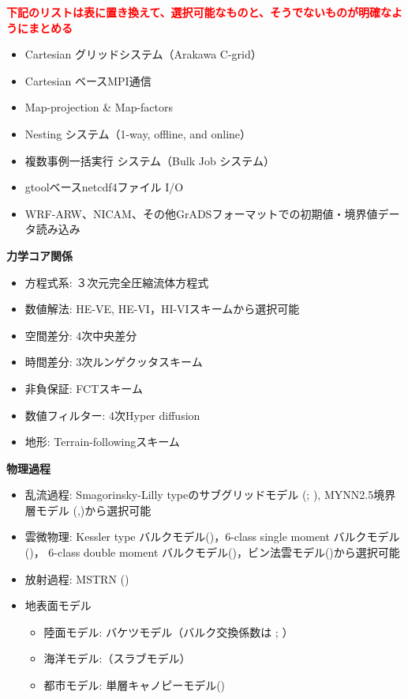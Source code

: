 \textcolor{red}{\bf 下記のリストは表に置き換えて、選択可能なものと、そうでないものが明確なようにまとめる}



\begin{itemize}
 \item Cartesian グリッドシステム（Arakawa C-grid）
 \item Cartesian ベースMPI通信
 \item Map-projection \& Map-factors
 \item Nesting システム（1-way, offline, and online）
 \item 複数事例一括実行 システム（Bulk Job システム）
 \item gtoolベースnetcdf4ファイル I/O
 \item WRF-ARW、NICAM、その他GrADSフォーマットでの初期値・境界値データ読み込み
\end{itemize}

{\bf 力学コア関係}

\begin{itemize}
 \item 方程式系: ３次元完全圧縮流体方程式
 \item 数値解法: HE-VE,  HE-VI，HI-VIスキームから選択可能
 \item 空間差分: 4次中央差分
 \item 時間差分: 3次ルンゲクッタスキーム
 \item 非負保証: FCTスキーム
 \item 数値フィルター: 4次Hyper diffusion
 \item 地形: Terrain-followingスキーム
\end{itemize}

{\bf 物理過程}

\begin{itemize}
 \item 乱流過程: Smagorinsky-Lilly typeのサブグリッドモデル (\cite{smagorinsky_1963}; \cite{lilly_1962}), 
MYNN2.5境界層モデル (\cite{my_1982},\cite{nakanishi_2004})から選択可能
 \item 雲微物理: Kessler type バルクモデル(\cite{kessler_1969})，6-class single moment バルクモデル(\cite{tomita_2008})，
6-class double moment バルクモデル(\cite{sn_2014})，ビン法雲モデル(\cite{suzuki_etal_2010})から選択可能
 \item 放射過程: MSTRN (\cite{sekiguchi_2008})
 \item 地表面モデル
  \begin{itemize}
   \item 陸面モデル: バケツモデル（バルク交換係数は \cite{beljaars_1991}; \cite{wilson_2001}）
   \item 海洋モデル:（スラブモデル）
   \item 都市モデル: 単層キャノピーモデル(\cite{kusaka_2001})
  \end{itemize}
\end{itemize}

